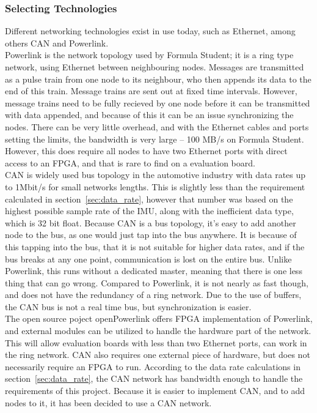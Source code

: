 \subsubsection{Selecting Technologies}
Different networking technologies exist in use today, such as Ethernet, among others CAN and Powerlink.\\
Powerlink is the network topology used by Formula Student; it is a ring type network, using Ethernet between neighbouring nodes.
Messages are transmitted as a pulse train from one node to its neighbour, who then appends its data to the end of this train. 
Message trains are sent out at fixed time intervals.
However, message trains need to be fully recieved by one node before it can be transmitted with data appended, and because of this it can be an issue synchronizing the nodes.
There can be very little overhead, and with the Ethernet cables and ports setting the limits, the bandwidth is very large -- 100 MB/s on Formula Student.
However, this does require all nodes to have two Ethernet ports with direct access to an FPGA, and that is rare to find on a evaluation board.\\

CAN is widely used bus topology in the automotive industry with data rates up to 1Mbit/s for small networks lengths.
This is slightly less than the requirement calculated in section~\ref{sec:data_rate}, however that number was based on the highest possible sample rate of the IMU, along with the inefficient data type, which is 32 bit float.
Because CAN is a bus topology, it's easy to add another node to the bus, as one would just tap into the bus anywhere.
It is because of this tapping into the bus, that it is not suitable for higher data rates, and if the bus breaks at any one point, communication is lost on the entire bus.
Unlike Powerlink, this runs without a dedicated master, meaning that there is one less thing that can go wrong.
Compared to Powerlink, it is not nearly as fast though, and does not have the redundancy of a ring network.
Due to the use of buffers, the CAN bus is not a real time bus, but synchronization is easier.\\

The open source poject openPowerlink offers FPGA implementation of Powerlink, and external modules can be utilized to handle the hardware part of the network.
This will allow evaluation boards with less than two Ethernet ports, can work in the ring network. 
CAN also requires one external piece of hardware, but does not necessarily require an FPGA to run. 
According to the data rate calculations in section~\ref{sec:data_rate}, the CAN network has bandwidth enough to handle the requirements of this project. 
Because it is easier to implement CAN, and to add nodes to it, it has been decided to use a CAN network.